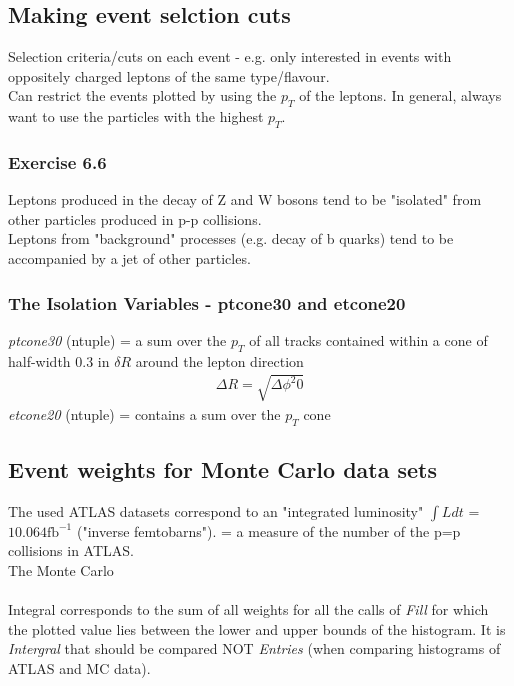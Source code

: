 \documentclass[11pt]{article}
\newcommand{\<}{\guilsinglleft}
\renewcommand{\>}{\guilsinglright}
\begin{document}
    \subsection{Making event selction cuts}
    Selection criteria/cuts on each event - e.g. only interested in events with oppositely charged leptons of the same type/flavour.
    \\
    Can restrict the events plotted by using the $p_T$ of the leptons.
    In general, always want to use the  particles with the highest $p_T$.
    
    \subsubsection{Exercise 6.6}
    
    
    Leptons produced in the decay of Z and W bosons tend to be "isolated" from other particles produced in p-p collisions.
    \\
    Leptons from "background" processes (e.g. decay of b quarks) tend to be accompanied by a jet of other particles.
    
    \subsubsection{The Isolation Variables - ptcone30 and etcone20}
    \textit{ptcone30} (ntuple)  = a sum over the $p_T$ of all tracks contained within a cone of half-width 0.3 in $\delta R$ around the lepton direction
    \begin{align}
        \Delta R = \sqrt{\Delta \phi^2 0}
    \end{align}
    \textit{etcone20} (ntuple) = contains a sum over the $p_T$ cone


    \subsection{Event weights for Monte Carlo data sets}
    The used ATLAS datasets correspond to an "integrated luminosity" $\int L dt$ = $10.064 \text{fb}^{-1}$ ("inverse femtobarns").
    = a measure of the number of the p=p collisions in ATLAS.
    \\
    The Monte Carlo
    \\\\
    Integral corresponds to the sum of all weights for all the calls of \textit{Fill} for which the plotted value lies between the lower and upper bounds of the histogram.
    It is \textit{Intergral} that should be compared NOT \textit{Entries} (when comparing histograms of ATLAS and MC data).
\end{document}
